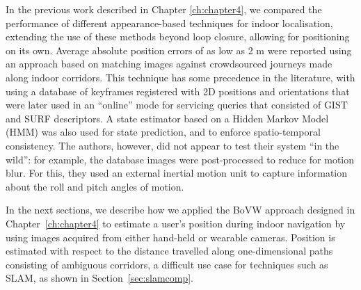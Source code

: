 
In the previous work \citep{RiveraWearable} described in Chapter \ref{ch:chapter4}, we compared the performance of different appearance-based techniques for indoor localisation, extending the use of these methods beyond loop closure, allowing for positioning on its own. Average absolute position errors of as low as 2 m were reported using an approach based on matching images against crowdsourced journeys made along indoor corridors. This technique has some precedence in the literature, with \citet{liu2010video} using a database of keyframes registered with 2D positions and orientations that were later used in an ``online'' mode for servicing queries that consisted of GIST and SURF descriptors. A state estimator based on a Hidden Markov Model (HMM) was also used for state prediction, and to enforce spatio-temporal consistency. The authors, however, did not appear to test their system ``in the wild'': for example, the database images were post-processed to reduce for motion blur. For this, they used an external inertial motion unit to capture information about the roll and pitch angles of motion. 

In the next sections, we describe how we applied the BoVW approach designed in Chapter~\ref{ch:chapter4} to estimate a user's position during indoor navigation by using images acquired from either hand-held or wearable cameras.  Position is estimated with respect to the distance travelled along one-dimensional paths consisting of ambiguous corridors, a difficult use case for techniques such as SLAM, as shown in Section~\ref{sec:slamcomp}.

